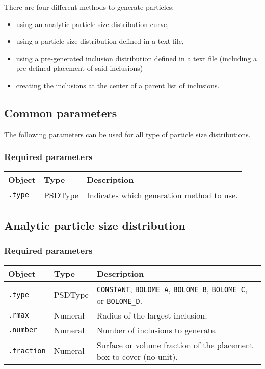 \documentclass[10pt]{article}
\begin{document}
There are four different methods to generate particles:
\begin{itemize}
	\item using an analytic particle size distribution curve,
	\item using a particle size distribution defined in a text file,
	\item using a pre-generated inclusion distribution defined in a text file (including a pre-defined placement of said inclusions)
	\item creating the inclusions at the center of a parent list of inclusions.
\end{itemize}

\subsection{Common parameters}

The following parameters can be used for all type of particle size distributions.

\subsubsection*{Required parameters}

\begin{tabularx}{\textwidth}{llX}
\hline 
Object & Type & Description \\ 
\hline 
\verb+.type+ & PSDType & Indicates which generation method to use. \\ 
\hline 
\end{tabularx}

\subsection{Analytic particle size distribution}

\subsubsection*{Required parameters}

\begin{tabularx}{\textwidth}{llX}
\hline 
Object & Type & Description \\ 
\hline 
\verb+.type+ & PSDType & \verb+CONSTANT+, \verb+BOLOME_A+, \verb+BOLOME_B+, \verb+BOLOME_C+, or \verb+BOLOME_D+. \\ 
\verb+.rmax+ & Numeral & Radius of the largest inclusion. \\ 
\verb+.number+ & Numeral & Number of inclusions to generate. \\ 
\verb+.fraction+ & Numeral & Surface or volume fraction of the placement box to cover (no unit). \\ 
\hline 
\end{tabularx}
\end{document}
